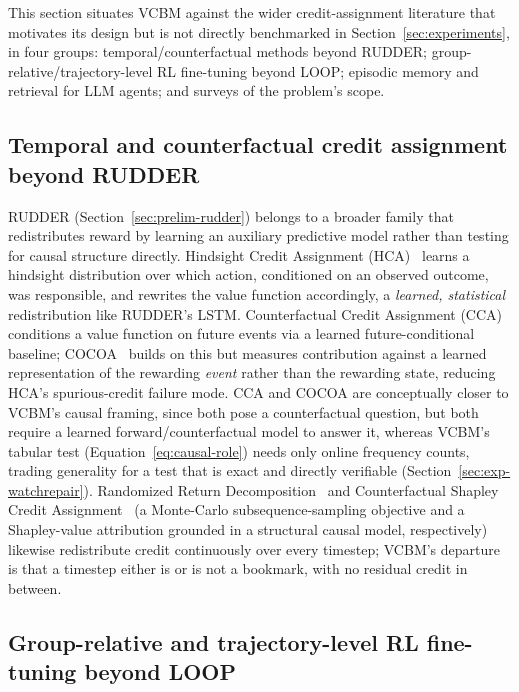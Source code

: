 This section situates VCBM against the wider credit-assignment literature that motivates its design but is not directly benchmarked in Section~\ref{sec:experiments}, in four groups: temporal/counterfactual methods beyond RUDDER; group-relative/trajectory-level RL fine-tuning beyond LOOP; episodic memory and retrieval for LLM agents; and surveys of the problem's scope.

\subsection{Temporal and counterfactual credit assignment beyond RUDDER}
\label{sec:rw-temporal}

RUDDER (Section~\ref{sec:prelim-rudder}) belongs to a broader family that redistributes reward by learning an auxiliary predictive model rather than testing for causal structure directly. Hindsight Credit Assignment (HCA)~\cite{hca2019} learns a hindsight distribution over which action, conditioned on an observed outcome, was responsible, and rewrites the value function accordingly, a \emph{learned, statistical} redistribution like RUDDER's LSTM. Counterfactual Credit Assignment (CCA)~\cite{cca2021} conditions a value function on future events via a learned future-conditional baseline; COCOA~\cite{cocoa2023} builds on this but measures contribution against a learned representation of the rewarding \emph{event} rather than the rewarding state, reducing HCA's spurious-credit failure mode. CCA and COCOA are conceptually closer to VCBM's causal framing, since both pose a counterfactual question, but both require a learned forward/counterfactual model to answer it, whereas VCBM's tabular test (Equation~\ref{eq:causal-role}) needs only online frequency counts, trading generality for a test that is exact and directly verifiable (Section~\ref{sec:exp-watchrepair}). Randomized Return Decomposition~\cite{randomized_return_decomp2022} and Counterfactual Shapley Credit Assignment~\cite{phi_ppo2026} (a Monte-Carlo subsequence-sampling objective and a Shapley-value attribution grounded in a structural causal model, respectively) likewise redistribute credit continuously over every timestep; VCBM's departure is that a timestep either is or is not a bookmark, with no residual credit in between.

\subsection{Group-relative and trajectory-level RL fine-tuning beyond LOOP}
\label{sec:rw-trajectory}

